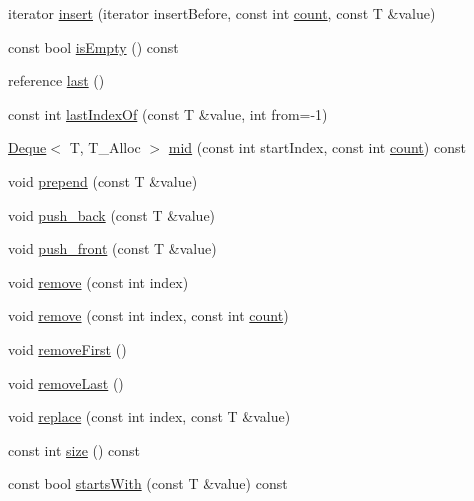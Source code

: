 \begin{DoxyCompactItemize}
\item 
iterator \hyperlink{namespaceprism_1_1aux_a5ddea176e048992d6fcc28bf6afc27ba}{insert} (iterator insert\+Before, const int \hyperlink{namespaceprism_1_1aux_a14e4de22b19399e53423b408f624d866}{count}, const T \&value)
\item 
const bool \hyperlink{namespaceprism_1_1aux_a056cd3e2a9b275da43658b45cb141852}{is\+Empty} () const 
\item 
reference \hyperlink{namespaceprism_1_1aux_a23a89c64fd9ee1f27799fe56c943a44d}{last} ()
\item 
const int \hyperlink{namespaceprism_1_1aux_a1c56b07e2e81113a801f4533d84baa92}{last\+Index\+Of} (const T \&value, int from=-\/1)
\item 
\hyperlink{classprism_1_1_deque}{Deque}$<$ T, T\+\_\+\+Alloc $>$ \hyperlink{namespaceprism_1_1aux_a8c605820c19faa728da11c03594c190b}{mid} (const int start\+Index, const int \hyperlink{namespaceprism_1_1aux_a14e4de22b19399e53423b408f624d866}{count}) const 
\item 
void \hyperlink{namespaceprism_1_1aux_a386d12e2908c0967706007f47883994b}{prepend} (const T \&value)
\item 
void \hyperlink{namespaceprism_1_1aux_a5638dc8c76cc3834f9371efcb4ec028f}{push\+\_\+back} (const T \&value)
\item 
void \hyperlink{namespaceprism_1_1aux_ad3e0c5f7eadd3f6a3fe99dc469de11ee}{push\+\_\+front} (const T \&value)
\item 
void \hyperlink{namespaceprism_1_1aux_a12ddcb0855cf8ec32503548006dd26c6}{remove} (const int index)
\item 
void \hyperlink{namespaceprism_1_1aux_a2940f156104bc560804fb6c26c9389a2}{remove} (const int index, const int \hyperlink{namespaceprism_1_1aux_a14e4de22b19399e53423b408f624d866}{count})
\item 
void \hyperlink{namespaceprism_1_1aux_ae062b2489c5805ab0bd0e4554d13bfab}{remove\+First} ()
\item 
void \hyperlink{namespaceprism_1_1aux_a4a7132c68a0630f19d5f1ab7f1edcb12}{remove\+Last} ()
\item 
void \hyperlink{namespaceprism_1_1aux_a0091a7927530194b1865a0d589051a31}{replace} (const int index, const T \&value)
\item 
const int \hyperlink{namespaceprism_1_1aux_a7311aa21cf3af7c4639ea15e4716de1b}{size} () const 
\item 
const bool \hyperlink{namespaceprism_1_1aux_a8cb92aad56edf97b5d59f9e27bbfcd1b}{starts\+With} (const T \&value) const 
\item 

\end{DoxyCompactItemize}
